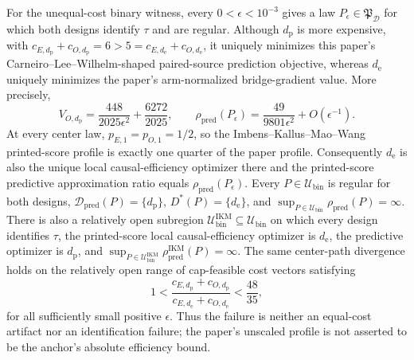 For the unequal-cost binary witness, every \(0<\epsilon<10^{-3}\) gives a law \(P_\epsilon\in\mathfrak P_{\mathcal D}\) for which both designs identify \(\tau\) and are regular. Although \(d_{\mathrm p}\) is more expensive, with \(c_{E,d_{\mathrm p}}+c_{O,d_{\mathrm p}}=6>5=c_{E,d_{\mathrm e}}+c_{O,d_{\mathrm e}}\), it uniquely minimizes this paper's Carneiro--Lee--Wilhelm-shaped paired-source prediction objective, whereas \(d_{\mathrm e}\) uniquely minimizes the paper's arm-normalized bridge-gradient value. More precisely,
\[
 V_{O,d_{\mathrm p}}=\frac{448}{2025\epsilon^2}+\frac{6272}{2025},\qquad
 \rho_{\mathrm{pred}}(P_\epsilon)=\frac{49}{9801\epsilon^2}+O(\epsilon^{-1}).
\]
At every center law, \(p_{E,1}=p_{O,1}=1/2\), so the Imbens--Kallus--Mao--Wang printed-score profile is exactly one quarter of the paper profile.  Consequently \(d_{\mathrm e}\) is also the unique local causal-efficiency optimizer there and the printed-score predictive approximation ratio equals \(\rho_{\mathrm{pred}}(P_\epsilon)\). Every \(P\in\mathcal U_{\mathrm{bin}}\) is regular for both designs, \(\mathcal D_{\mathrm{pred}}(P)=\{d_{\mathrm p}\}\), \(D^*(P)=\{d_{\mathrm e}\}\), and \(\sup_{P\in\mathcal U_{\mathrm{bin}}}\rho_{\mathrm{pred}}(P)=\infty\).  There is also a relatively open subregion \(\mathcal U_{\mathrm{bin}}^{\mathrm{IKM}}\subseteq\mathcal U_{\mathrm{bin}}\) on which every design identifies \(\tau\), the printed-score local causal-efficiency optimizer is \(d_{\mathrm e}\), the predictive optimizer is \(d_{\mathrm p}\), and \(\sup_{P\in\mathcal U_{\mathrm{bin}}^{\mathrm{IKM}}}\rho_{\mathrm{pred}}^{\mathrm{IKM}}(P)=\infty\). The same center-path divergence holds on the relatively open range of cap-feasible cost vectors satisfying
\[
 1<\frac{c_{E,d_{\mathrm p}}+c_{O,d_{\mathrm p}}}
 {c_{E,d_{\mathrm e}}+c_{O,d_{\mathrm e}}}<\frac{48}{35},
\]
for all sufficiently small positive \(\epsilon\). Thus the failure is neither an equal-cost artifact nor an identification failure; the paper's unscaled profile is not asserted to be the anchor's absolute efficiency bound.